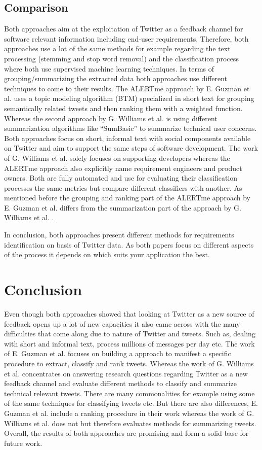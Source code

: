 \documentclass[a4paper,10pt, bibliography=totocnumbered]{scrreprt}
\begin{document}
\section{Comparison}
Both approaches aim at the exploitation of Twitter as a feedback channel for software relevant information including end-user requirements. Therefore, both approaches use a lot of the same methods for example regarding the text processing (stemming and stop word removal) and the classification process where both use supervised machine learning techniques. In terms of grouping/summarizing the extracted data both approaches use different techniques to come to their results. The ALERTme approach by E. Guzman et al. \cite{Guzman} uses a topic modeling algorithm (BTM) specialized in short text for grouping semantically related tweets and then ranking them with a weighted function. Whereas the second approach by G. Williams et al. \cite{Williams} is using different summarization algorithms like “SumBasic” to summarize technical user concerns. Both approaches focus on short, informal text with social components available on Twitter and aim to support the same steps of software development. The work of G. Williams et al. \cite{Williams} solely focuses on supporting developers whereas the ALERTme approach also explicitly name requirement engineers and product owners. Both are fully automated and use for evaluating their classification processes the same metrics but compare different classifiers with another. As mentioned before the grouping and ranking part of the ALERTme approach by E. Guzman et al. \cite{Guzman} differs from the summarization part of the approach by G. Williams et al. \cite{Williams}. 

In conclusion, both approaches present different methods for requirements identification on basis of Twitter data. As both papers focus on different aspects of the process it depends on which suits your application the best.

\chapter{Conclusion}
\label{chap:6}

Even though both approaches showed that looking at Twitter as a new source of feedback opens up a lot of new capacities it also came across with the many difficulties that come along due to nature of Twitter and tweets. Such as, dealing with short and informal text, process millions of messages per day etc.
The work of E. Guzman et al. \cite{Guzman} focuses on building a approach to manifest a specific procedure to extract, classify and rank tweets. Whereas the work of G. Williams et al. \cite{Williams} concentrates on answering research questions regarding Twitter as a new feedback channel and evaluate different methods to classify and summarize technical relevant tweets. There are many commonalities for example using some of the same techniques for classifying tweets etc. 
But there are also differences, E. Guzman et al. \cite{Guzman} include a ranking procedure in their work whereas the work of G. Williams et al. \cite{Williams} does not but therefore evaluates methods for summarizing tweets.
Overall, the results of both approaches are promising and form a solid base for future work.
\end{document}
